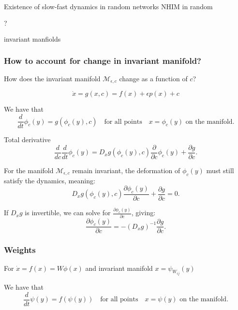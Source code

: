 \documentclass{article}
\theoremstyle{definition} \newtheorem{definition}{Definition}
\theoremstyle{remark} \newtheorem{remark}{Remark}
\newcommand{\manifold}{\mathcal{M}}
\newcounter{ct}
\begin{document}
Existence of slow-fast dynamics in random networks \citep{schmalfuss2008invariant, shaham2017slow}
NHIM in random \citep{li2013normally}

? \citep{federer2018self}

invariant manfiolds \citep{guckenheimer2015invariant}

\subsubsection{How to account for change in invariant manifold?}
How does the invariant manifold $\manifold_{\epsilon,c}$ change as a function of $c$?

\begin{equation}
\dot x = g(x,c) = f(x) + \epsilon p(x) + c
\end{equation}

We have that 
\begin{equation}
\frac{d}{dt} \phi_c(y) =g(\phi_c(y), c) \quad \text{for all points} \quad x = \phi_c(y) \text{ on the manifold}.
\end{equation}

Total derivative
\begin{equation}
\frac{d}{dc} \frac{d}{dt} \phi_c(y) = D_x g(\phi_c(y), c) \frac{\partial}{\partial c} \phi_c(y) + \frac{\partial g}{\partial c}.
\end{equation}


For the manifold $\manifold_{\epsilon,c}$ remain invariant, the deformation of $\phi_c(y)$ must still satisfy the dynamics, meaning:
\begin{equation}
D_x g(\phi_c(y), c) \frac{\partial \phi_c(y)}{\partial c} + \frac{\partial g}{\partial c} = 0.
\end{equation}

If $D_x g$ is invertible, we can solve for $\frac{\partial \phi_c(y)}{\partial c}$, giving:
\begin{equation}
\frac{\partial \phi_c(y)}{\partial c} = - (D_x g)^{-1} \frac{\partial g}{\partial c}.
\end{equation}


\subsubsection{Weights}
For $\dot x= f(x) =W\phi(x)$ and invariant manifold $x=\psi_{W_{ij}}(y)$

We have that 
\begin{equation}
\frac{d}{dt} \psi(y) =f(\psi(y)) \quad \text{for all points} \quad x = \psi(y) \text{ on the manifold}.
\end{equation}
\end{document}
